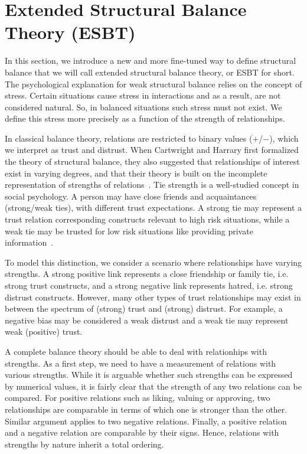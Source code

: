 
\section{Extended Structural Balance Theory (ESBT)} \label{sec:esbt}
In this section, we introduce a new and more fine-tuned way to define
structural balance that we will call extended structural balance
theory, or ESBT for short. The psychological explanation for weak
structural balance relies on the concept of stress. Certain situations
cause stress in interactions and as a result, are not considered
natural. So, in balanced situations such stress must not exist. We
define this stress more precisely as a function of the strength of
relationships.

In classical balance theory, relations are restricted to binary values
($+$/$-$), which we interpret as trust and distrust. When Cartwright
and Harrary first formalized the theory of structural balance, they
also suggested that relationships of interest exist in varying
degrees, and that their theory is built on the incomplete
representation of strengths of relations~\cite{Cartwright:56}. Tie
strength is a well-studied concept in social psychology. A person may
have close friends and acquaintances (strong/weak ties), with
different trust expectations. A strong tie may represent a trust
relation corresponding constructs relevant to high risk situations,
while a weak tie may be trusted for low risk situations like providing
private information~\cite{Granovetter:1973}.

To model this distinction, we consider a scenario where relationships
have varying strengths. A strong positive link represents a close
friendship or family tie, i.e. strong trust constructs, and a strong
negative link represents hatred, i.e. strong distrust
constructs. However, many other types of trust relationships may exist
in between the spectrum of (strong) trust and (strong) distrust. For
example, a negative bias may be considered a weak distrust and a weak
tie may represent weak (positive) trust.
 
A complete balance theory should be able to deal with relationhips
with strengths.  As a first step, we need to have a measurement of
relations with various strengths. While it is arguable whether
such strengths can be expressed by numerical values, it is fairly
clear that the strength of any two relations can be compared. For
positive relations such as liking, valuing or approving, two
relationships are comparable in terms of which one is stronger than
the other. Similar argument applies to two negative
relations. Finally, a positive relation and a negative relation are
comparable by their signs. Hence, relations with strengths by nature
inherit a total ordering.
 
